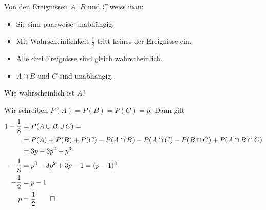 Von den Ereignissen $A$, $B$ und $C$ weiss man:
\begin{itemize}
\item Sie sind paarweise unabhängig.
\item Mit Wahrscheinlichkeit $\frac18$ tritt keines der
Ereignisse ein.
\item Alle drei Ereignisse sind gleich wahrscheinlich.
\item $A\cap B$ und $C$ sind unabhängig.
\end{itemize}
Wie wahrscheinlich ist $A$?


\begin{loesung}
Wir schreiben $P(A)=P(B)=P(C)=p$. Dann gilt
\begin{align*}
1-\frac18&=
P(A\cup B\cup C)=
\\
&=P(A)+P(B)+P(C) -P(A\cap B)-P(A\cap C)-P(B\cap C)+P(A\cap B\cap C)
\\
&=3p-3p^2+p^3
\\
-\frac18&=p^3-3p^2+3p-1=(p-1)^3
\\
-\frac12&=p-1\\
p&=\frac12
\qedhere
\end{align*}
\end{loesung}

